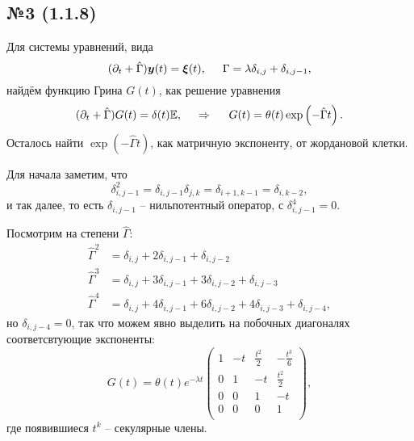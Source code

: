 \subsection*{№3 (1.1.8)}

Для системы уравнений, вида
\begin{equation*}
    (\partial_t + \hat{\Gamma}) \mbox{\boldmath $y$}(t)  = \mbox{\boldmath $\xi$}(t),
    \hspace{5 mm} 
    \Gamma = \lambda \delta_{i,j} + \delta_{i,j-1},
\end{equation*}
найдём функцию Грина $G(t)$, как решение уравнения
\begin{equation*}
    (\partial_t +   \hat{\Gamma}) G(t) = \delta(t) \mathbb{E},
    \hspace{0.5cm} \Rightarrow \hspace{0.5cm}
    G(t) = \theta(t) \exp\left(- \hat{\Gamma} t\right).
\end{equation*}
Осталось найти $\exp(-\hat{\Gamma} t)$, как матричную экспоненту, от жордановой клетки. 

Для начала заметим, что
\begin{equation*}
    \delta_{i,j-1}^2 = \delta_{i,j-1} \delta_{j, k} = \delta_{i+1, k-1} = \delta_{i, k-2},
\end{equation*}
и так далее, то есть $\delta_{i, j-1}$ -- нильпотентный оператор, с $\delta_{i, j-1}^4 = 0$.

Посмотрим на степени $\hat{\Gamma}$:
\begin{align*}
    \hat{\Gamma}^2 &= \delta_{i,j} + 2 \delta_{i,j-1} + \delta_{i, j-2} \\
    \hat{\Gamma}^3 &= \delta_{i,j} + 3 \delta_{i,j-1} + 3 \delta_{i, j-2} + \delta_{i, j-3}\\
    \hat{\Gamma}^4 &= \delta_{i,j} + 4 \delta_{i,j-1} + 6 \delta_{i, j-2} + 4\delta_{i, j-3} + 
    \delta_{i,j-4}, 
\end{align*}
но $\delta_{i,j-4} = 0$, так что можем явно выделить на побочных диагоналях соответсвтующие экспоненты:
\begin{equation*}
    G(t) = \theta(t) e^{- \lambda t} 
    \left(
        \begin{array}{cccc}
         1 & -t & \tfrac{t^2}{2} & -\tfrac{t^3}{6} \\
         0 & 1 & -t & \tfrac{t^2}{2} \\
         0 & 0 & 1 & -t \\
         0 & 0 & 0 & 1 \\
        \end{array}
    \right),
\end{equation*}
где появившиеся $t^k$ -- секулярные члены. 





